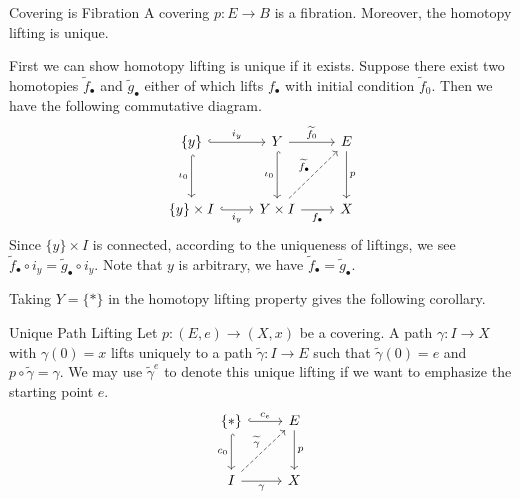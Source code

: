 \documentclass{report}
\begin{document}
\begin{theorem}{Covering is Fibration}{}
	A covering $p: E \rightarrow B$ is a fibration. Moreover, the homotopy lifting is unique.
\end{theorem}

\begin{prf}
	First we can show homotopy lifting is unique if it exists. Suppose there exist two homotopies $\widetilde{f}_{\bullet}$ and $\widetilde{g}_{\bullet}$ either of which lifts $f_{\bullet}$ with initial condition $\widetilde{f}_0$. Then we have the following commutative diagram.
	\[
		\begin{tikzcd}[ampersand replacement=\&]
			\{y\}\arrow[r, "i_y", hook]\arrow[d, "\iota_0"', hook]\&Y \arrow[r, "\widetilde{f}_0"] \arrow[d, "\iota_0"', hook]                      \& E \arrow[d, "p"] \\ [+13pt]
			\{y\} \arrow[r, "i_y"', hook]  \times I\&Y\times I \arrow[r, "f_\bullet"'] \arrow[ru, "\widetilde{f}_{\bullet}", dashed] \& X
		\end{tikzcd}
	\]
	Since $\{y\}\times I$ is connected, according to the uniqueness of liftings, we see $\widetilde{f}_{\bullet}\circ i_y=\widetilde{g}_{\bullet}\circ i_y$. Note that $y$ is arbitrary, we have $\widetilde{f}_{\bullet}=\widetilde{g}_{\bullet}$.
\end{prf}


Taking $Y=\{*\}$ in the homotopy lifting property gives the following corollary.

\begin{corollary}{Unique Path Lifting}{}
	Let $p: (E,e) \to (X,x)$ be a covering. A path $\gamma: I \to X$ with $\gamma(0)=x$ lifts uniquely to a path $\widetilde{\gamma}: I \to E$ such that $\widetilde{\gamma}(0)=e$ and $p \circ \widetilde{\gamma}=\gamma$. We may use $\widetilde{\gamma}^e$ to denote this unique lifting if we want to emphasize the starting point $e$.
	\[
		\begin{tikzcd}[ampersand replacement=\&]
			\{*\} \arrow[r, "c_e", hook] \arrow[d, "c_0"', hook]                      \& E \arrow[d, "p"] \\ [+8pt]
			I \arrow[r, "\gamma"'] \arrow[ru, "\widetilde{\gamma}", dashed] \& X
		\end{tikzcd}
	\]
\end{corollary}
\end{document}
